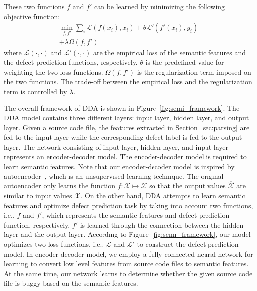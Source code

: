 These two functions $f$ and $f'$ can be learned by minimizing the following objective function:
\begin{equation}
\label{eq:loss}
\begin{split}
\min_{f,f'} \sum_{i}^{}\mathcal{L}(f(x_i), x_i) + \theta \mathcal{L'}(f'(x_i), y_i) \\
+ \lambda \Omega(f, f')
\end{split}
\end{equation}
where $\mathcal{L}(\cdot, \cdot)$ and $\mathcal{L}'(\cdot, \cdot)$ are the empirical loss of the semantic features and the defect prediction functions, respectively. $\theta$ is the predefined value for weighting the two loss functions. $\Omega(f, f')$ is the regularization term imposed on the two functions. The trade-off between the empirical loss and the regularization term is controlled by $\lambda$. 

The overall framework of DDA is shown in Figure~\ref{fig:semi_framework}. The DDA model contains three different layers: input layer, hidden layer, and output layer. Given a source code file, the features extracted in Section~\ref{sec:parsing} are fed to the input layer while the corresponding defect label is fed to the output layer. The network consisting of input layer, hidden layer, and input layer represents an encoder-decoder model. The encoder-decoder model is required to learn semantic features. Note that our encoder-decoder model is inspired by autoencoder~\cite{ng2011sparse}, which is an unsupervised learning technique. The original autoencoder only learns the function $f: \mathcal{X} \longmapsto \mathcal{X}$ so that the output values $\mathcal{\hat{X}}$ are similar to input values $\mathcal{X}$. On the other hand, DDA attempts to learn semantic features and optimize defect prediction task by taking into account two functions, i.e., $f$ and $f'$, which represents the semantic features and defect prediction function, respectively. $f'$ is learned through the connection between the hidden layer and the output layer. According to Figure~\ref{fig:semi_framework}, our model optimizes two loss functions, i.e., $\mathcal{L}$ and $\mathcal{L'}$ to construct the defect prediction model. In encoder-decoder model, we employ a fully connected neural network for learning to convert low level features from source code files to semantic features. At the same time, our network learns to determine whether the given source code file is buggy based on the semantic features. 

